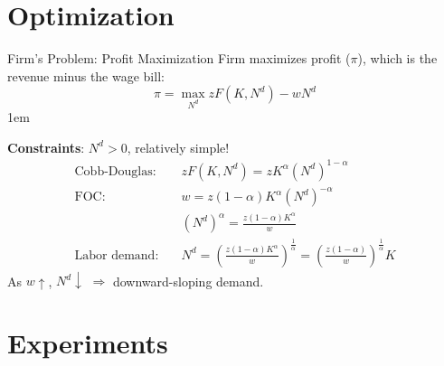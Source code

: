 \documentclass[11pt,aspectratio=43]{beamer} \usepackage[utf8]{inputenc}
\let\olditemize=\itemize
\let\endolditemize=\enditemize
\renewenvironment{itemize}{\olditemize \itemsep1em}{\endolditemize}
\theoremstyle{definition}
\begin{document}
\section{Optimization}
\label{sec:Optimization}

\begin{frame}{Firm's Problem: Profit Maximization}
\label{slide:Firm_s_Problem__Profit_Maximization}
Firm maximizes profit ($\pi$), which is the revenue minus the wage bill:
\begin{equation}
\label{eq:profit}
    \pi = \max_{N^{d}} z F( K, N^{d} ) - w N^{d}
\end{equation}
\begin{itemize}
    \item \textbf{Constraints}: $ N^{d} > 0 $, relatively simple!
        \begin{align}
            \text{Cobb-Douglas:} \quad
                & z F( K, N^{d} ) = z K^{\alpha} ( N^{d} )^{1-\alpha}
            \\
            \text{FOC:} \quad
                & w = z ( 1-\alpha ) K^{\alpha} ( N^{d} )^{-\alpha}
            \\
                & ( N^{d} )^{\alpha} = \frac{z ( 1-\alpha ) K^{\alpha}}{w}
            \\
            \text{Labor demand:} \quad
                & N^{d} = \left(
                    \frac{z ( 1-\alpha ) K^{\alpha}}{w}
                \right)^{\frac{1}{\alpha}}
                =
                \left(
                    \frac{z ( 1-\alpha ) }{w}
                \right)^{\frac{1}{\alpha}} K
        \end{align}
        As $ w \uparrow  $, $ N^{d} \downarrow  $ $ \Rightarrow  $ \alert{downward-sloping} demand.
\end{itemize}
\end{frame}

\section{Experiments}
\label{sec:Experiments}
\end{document}
